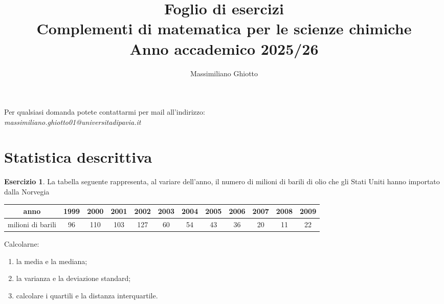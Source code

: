 \documentclass[12pt,a4paper]{article}
\title{Foglio di esercizi\\Complementi di matematica per le scienze chimiche\\ Anno accademico 2025/26}
\author{Massimiliano Ghiotto}
\date{}
\theoremstyle{definition}
\newtheorem{exe}{Esercizio}
\begin{document}
\maketitle
\noindent
Per qualsiasi domanda potete contattarmi per mail all'indirizzo:
\\
\textit{massimiliano.ghiotto01@universitadipavia.it}

\section{Statistica descrittiva}

\begin{exe}
	La tabella seguente rappresenta, al variare dell'anno, il numero di milioni di barili di olio che gli Stati Uniti hanno importato dalla Norvegia
	\begin{center}
		\begin{tabular}{|c|c|c|c|c|c|c|c|c|c|c|c|}
			\hline
			anno              & 1999 & 2000 & 2001 & 2002 & 2003 & 2004 & 2005 & 2006 & 2007 & 2008 & 2009 \\
			\hline
			milioni di barili & 96   & 110  & 103  & 127  & 60   & 54   & 43   & 36   & 20   & 11   & 22
			\\
			\hline
		\end{tabular}
	\end{center}
	Calcolarne:
	\begin{enumerate}
		\item  la media e la mediana;
		\item la varianza e la deviazione standard;
		\item calcolare i quartili e la distanza interquartile.
	\end{enumerate}
\end{exe}
\end{document}
